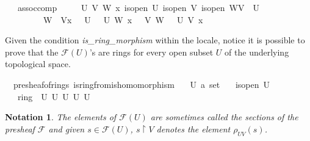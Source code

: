 \documentclass[12pt]{scrartcl}
\newtheorem{notation}{Notation}
\begin{document}
\begin{isabelle}
\ \ \ assoc{\isacharunderscore}{\kern0pt}comp{\isacharcolon}{\kern0pt}\ \isanewline
\ \ \ \ {\isachardoublequoteopen}{\isasymAnd}U\ V\ W\ x{\isachardot}{\kern0pt}\ {\isasymlbrakk}is{\isacharunderscore}{\kern0pt}open\ U{\isacharsemicolon}{\kern0pt}\ is{\isacharunderscore}{\kern0pt}open\ V{\isacharsemicolon}{\kern0pt}\ is{\isacharunderscore}{\kern0pt}open\ W{\isacharsemicolon}{\kern0pt}V\ {\isasymsubseteq}\ U{\isacharsemicolon}{\kern0pt}\ \isanewline
\ \ \ \ \ \ \ \ \ W\ {\isasymsubseteq}\ V{\isacharsemicolon}{\kern0pt}x\ {\isasymin}\ {\isacharparenleft}{\kern0pt}{\isasymFF}\ U{\isacharparenright}{\kern0pt}{\isasymrbrakk}\ {\isasymLongrightarrow}\ {\isasymrho}\ U\ W\ x\ {\isacharequal}{\kern0pt}\ {\isacharparenleft}{\kern0pt}{\isasymrho}\ V\ W\ {\isasymcirc}\ {\isasymrho}\ U\ V{\isacharparenright}{\kern0pt}\ x{\isachardoublequoteclose}
\end{isabelle}

Given the condition \textit{is\_ring\_morphism} within the locale, notice it is possible to prove that the $\mathscr{F}(U)$'s are rings for every open subset $U$ of the underlying topological space.

\begin{isabelle}
\isamarkupfalse%
\ {\isacharparenleft}{\kern0pt}\ presheaf{\isacharunderscore}{\kern0pt}of{\isacharunderscore}{\kern0pt}rings{\isacharparenright}{\kern0pt}\ is{\isacharunderscore}{\kern0pt}ring{\isacharunderscore}{\kern0pt}from{\isacharunderscore}{\kern0pt}is{\isacharunderscore}{\kern0pt}homomorphism{\isacharcolon}{\kern0pt}\isanewline
\ \ \ U{\isacharcolon}{\kern0pt}{\isacharcolon}{\kern0pt}\ {\isachardoublequoteopen}{\isacharprime}{\kern0pt}a\ set{\isachardoublequoteclose}\isanewline
\ \ \ {\isachardoublequoteopen}is{\isacharunderscore}{\kern0pt}open\ U{\isachardoublequoteclose}\isanewline
\ \ \ {\isachardoublequoteopen}ring\ {\isacharparenleft}{\kern0pt}{\isasymFF}\ U{\isacharparenright}{\kern0pt}\ {\isacharparenleft}{\kern0pt}{\isacharplus}{\kern0pt}\isactrlbsub U\isactrlesub {\isacharparenright}{\kern0pt}\ {\isacharparenleft}{\kern0pt}{\isasymcdot}\isactrlbsub U\isactrlesub {\isacharparenright}{\kern0pt}\ {\isasymzero}\isactrlbsub U\isactrlesub \ {\isasymone}\isactrlbsub U\isactrlesub {\isachardoublequoteclose}
\end{isabelle}

\begin{notation}
	The elements of $\mathscr{F}(U)$ are sometimes called the sections of the presheaf $\mathscr{F}$ and given $s \in \mathscr{F}(U)$, $s\restriction V$ denotes the element $\rho_{UV}(s)$.
\end{notation}
\end{document}
